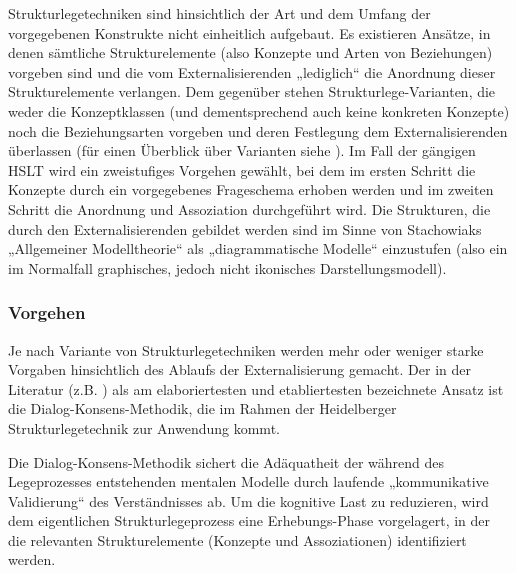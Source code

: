 Strukturlegetechniken sind hinsichtlich der Art und dem Umfang der vorgegebenen Konstrukte nicht einheitlich aufgebaut. Es existieren Ansätze, in denen sämtliche Strukturelemente (also Konzepte und Arten von Beziehungen) vorgeben sind und die vom Externalisierenden „lediglich“ die Anordnung dieser Strukturelemente verlangen. Dem gegenüber stehen Strukturlege-Varianten, die weder die Konzeptklassen (und dementsprechend auch keine konkreten Konzepte) noch die Beziehungsarten vorgeben und deren Festlegung dem Externalisierenden überlassen (für einen Überblick über Varianten siehe \citep[][S. 29]{Ifenthaler06}). Im Fall der gängigen \gls{HSLT} \citep{Scheele88} wird ein zweistufiges Vorgehen gewählt, bei dem im ersten Schritt die Konzepte durch ein vorgegebenes Frageschema erhoben werden und im zweiten Schritt die Anordnung und Assoziation durchgeführt wird. Die Strukturen, die durch den Externalisierenden gebildet werden sind im Sinne von Stachowiaks „Allgemeiner Modelltheorie“ \citep{Stachowiak73} als „diagrammatische Modelle“ einzustufen (also ein im Normalfall graphisches, jedoch nicht ikonisches Darstellungsmodell).

\subsubsection{Vorgehen}

Je nach Variante von Strukturlegetechniken werden mehr oder weniger starke Vorgaben hinsichtlich des Ablaufs der Externalisierung gemacht. Der in der Literatur (z.B. \citep{Ifenthaler06}) als am elaboriertesten und etabliertesten bezeichnete Ansatz ist die Dialog-Konsens-Methodik, die im Rahmen der Heidelberger Strukturlegetechnik \citep{Scheele88} zur Anwendung kommt.

Die Dialog-Konsens-Methodik sichert die Adäquatheit der während des Legeprozesses entstehenden mentalen Modelle durch laufende „kommunikative Validierung“ des Verständnisses ab. Um die kognitive Last zu reduzieren, wird dem eigentlichen Strukturlegeprozess eine Erhebungs-Phase vorgelagert, in der die relevanten Strukturelemente (Konzepte und Assoziationen) identifiziert werden. 

